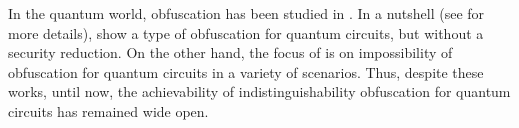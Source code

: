 In the quantum world, obfuscation has been studied in \cite{AJJ14,AF16arxiv}. In a nutshell (see  for more details), \cite{AJJ14} show a type of obfuscation for quantum circuits, but without a security reduction.  On the other hand,  the focus of \cite{AF16arxiv} is on impossibility of obfuscation for quantum circuits in a variety of scenarios. Thus, despite these works, until now, the achievability of indistinguishability obfuscation for quantum circuits has remained wide open.










